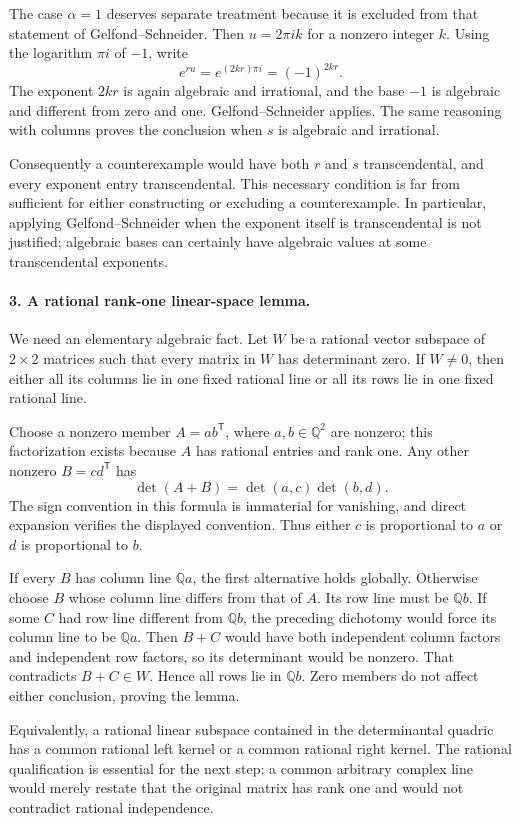 \documentclass[11pt]{article}
\begin{document}
The case $\alpha=1$ deserves separate treatment because it is excluded from that statement of Gelfond--Schneider. Then $u=2\pi i k$ for a nonzero integer $k$. Using the logarithm $\pi i$ of $-1$, write
\[
 e^{ru}=e^{(2kr)\pi i}=(-1)^{2kr}.
\]
The exponent $2kr$ is again algebraic and irrational, and the base $-1$ is algebraic and different from zero and one. Gelfond--Schneider applies. The same reasoning with columns proves the conclusion when $s$ is algebraic and irrational.

Consequently a counterexample would have both $r$ and $s$ transcendental, and every exponent entry transcendental. This necessary condition is far from sufficient for either constructing or excluding a counterexample. In particular, applying Gelfond--Schneider when the exponent itself is transcendental is not justified; algebraic bases can certainly have algebraic values at some transcendental exponents.

\paragraph{3. A rational rank-one linear-space lemma.}
We need an elementary algebraic fact. Let $W$ be a rational vector subspace of $2\times2$ matrices such that every matrix in $W$ has determinant zero. If $W\ne0$, then either all its columns lie in one fixed rational line or all its rows lie in one fixed rational line.

Choose a nonzero member $A=ab^{\mathsf T}$, where $a,b\in\mathbb Q^2$ are nonzero; this factorization exists because $A$ has rational entries and rank one. Any other nonzero $B=cd^{\mathsf T}$ has
\[
 \det(A+B)=\det(a,c)\det(b,d).
\]
The sign convention in this formula is immaterial for vanishing, and direct expansion verifies the displayed convention. Thus either $c$ is proportional to $a$ or $d$ is proportional to $b$.

If every $B$ has column line $\mathbb Qa$, the first alternative holds globally. Otherwise choose $B$ whose column line differs from that of $A$. Its row line must be $\mathbb Qb$. If some $C$ had row line different from $\mathbb Qb$, the preceding dichotomy would force its column line to be $\mathbb Qa$. Then $B+C$ would have both independent column factors and independent row factors, so its determinant would be nonzero. That contradicts $B+C\in W$. Hence all rows lie in $\mathbb Qb$. Zero members do not affect either conclusion, proving the lemma.

Equivalently, a rational linear subspace contained in the determinantal quadric has a common rational left kernel or a common rational right kernel. The rational qualification is essential for the next step: a common arbitrary complex line would merely restate that the original matrix has rank one and would not contradict rational independence.
\end{document}
